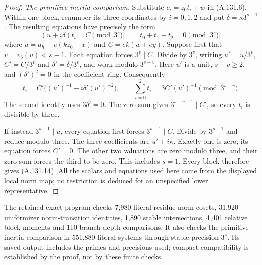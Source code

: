 \begin{proof}
\emph{The primitive-inertia comparison.}
Substitute \(c_i=z_0t_i+w\) in (A.131.6).
Within one block, renumber its three coordinates by
\(i=0,1,2\) and put \(\delta=\kappa3^{s-1}\).
The resulting equations have precisely the form
\[
                  (u+i\delta)t_i=C\pmod{3^s},
                   \qquad t_0+t_1+t_2=0\pmod{3^s},
 \tag{A.131.15}
\]
where \(u=a_h-e(kz_0-x)\) and
\(C=ek(w+ey)\).
Suppose first that \(v=v_3(u)<s-1\).
Each equation forces \(3^v\mid C\).
Divide by \(3^v\), writing \(u'=u/3^v\),
\(C'=C/3^v\) and \(\delta'=\delta/3^v\), and work
modulo \(3^{s-v}\).
Here \(u'\) is a unit, \(s-v\ge2\), and
\((\delta')^2=0\) in the coefficient ring.
Consequently
\[
       t_i=C'\bigl((u')^{-1}-i\delta'(u')^{-2}\bigr),
                \qquad \sum_{i=0}^2 t_i=3C'(u')^{-1}
                         \pmod{3^{s-v}}.
 \tag{A.131.16}
\]
The second identity uses \(3\delta'=0\).
The zero sum gives \(3^{s-v-1}\mid C'\), so every
\(t_i\) is divisible by three.

If instead \(3^{s-1}\mid u\), every equation first
forces \(3^{s-1}\mid C\).
Divide by \(3^{s-1}\) and reduce modulo three.
The three coefficients are \(u'+i\kappa\).
Exactly one is zero; its equation forces \(C'=0\).
The other two valuations are zero modulo three,
and their zero sum forces the third to be zero.
This includes \(s=1\).
Every block therefore gives (A.131.14).
All the scalars and equations used here come from
the displayed local norm map; no restriction is
deduced for an unspecified lower representative.
\end{proof}

The retained exact program
checks 7,980 literal residue-norm cosets, 31,920
uniformizer norm-transition identities, 1,890 stable
intersections, 4,401 relative block moments and 110
branch-depth comparisons.  It also checks the primitive
inertia comparison in 551,880 literal systems through
stable precision \(3^4\).  Its saved output includes
the primes and precisions used; compact compatibility
is established by the proof, not by these finite checks.

